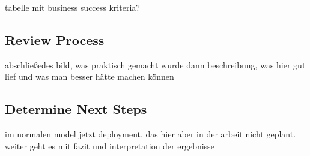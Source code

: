 tabelle mit business success kriteria? 

\subsection{Review Process}
abschließedes bild, was praktisch gemacht wurde
dann beschreibung, was hier gut lief und was man besser hätte machen können

\subsection{Determine Next Steps}
im normalen model jetzt deployment. das hier aber in der arbeit nicht geplant.
weiter geht es mit fazit und interpretation der ergebnisse



